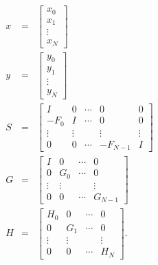 \begin{eqnarray}
x&=&\left[\begin{array}{c}
x_0\\
x_1\\
\vdots\\
x_N\end{array}\right]\nonumber\\
y&=&\left[\begin{array}{c}
y_0\\
y_1\\
\vdots\\
y_N\end{array}\right]\nonumber\\
S&=&\left[\begin{array}{ccccc}
I&0&\cdots&0&0\\
-F_0&I&\cdots&0&0\\
\vdots&\vdots&&\vdots&\vdots\\
0&0&\cdots&-F_{N-1}&I\end{array}\right]\nonumber\\
G&=&\left[\begin{array}{cccc}
I&0&\cdots&0\\
0&G_0&\cdots&0\\
\vdots&\vdots&&\vdots\\
0&0&\cdots&G_{N-1}\end{array}\right]\nonumber\\
H&=&\left[\begin{array}{cccc}
H_0&0&\cdots&0\\
0&G_1&\cdots&0\\
\vdots&\vdots&&\vdots\\
0&0&\cdots&H_N\end{array}\right].
\label{e.wf.6a}
\end{eqnarray}
%

